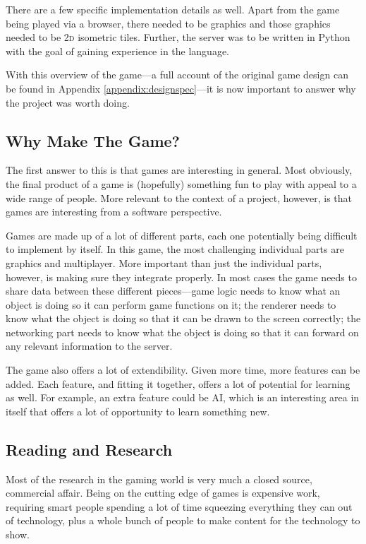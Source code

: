 There are a few specific implementation details as well. Apart from the game being played via a browser, there needed to be graphics and those graphics needed to be \textsc{2d} isometric tiles. Further, the server was to be written in Python with the goal of gaining experience in the language.

With this overview of the game---a full account of the original game design can be found in Appendix \ref{appendix:designspec}---it is now important to answer why the project was worth doing.

\subsection{Why Make The Game?}
The first answer to this is that games are interesting in general. Most obviously, the final product of a game is (hopefully) something fun to play with appeal to a wide range of people. More relevant to the context of a project, however, is that games are interesting from a software perspective.

Games are made up of a lot of different parts, each one potentially being difficult to implement by itself. In this game, the most challenging individual parts are graphics and multiplayer. More important than just the individual parts, however, is making sure they integrate properly. In most cases the game needs to share data between these different pieces---game logic needs to know what an object is doing so it can perform game functions on it; the renderer needs to know what the object is doing so that it can be drawn to the screen correctly; the networking part needs to know what the object is doing so that it can forward on any relevant information to the server.

The game also offers a lot of extendibility. Given more time, more features can be added. Each feature, and fitting it together, offers a lot of potential for learning as well. For example, an extra feature could be AI, which is an interesting area in itself that offers a lot of opportunity to learn something new.

\subsection{Reading and Research}
Most of the research in the gaming world is very much a closed source, commercial affair. Being on the cutting edge of games is expensive work, requiring smart people spending a lot of time squeezing everything they can out of technology, plus a whole bunch of people to make content for the technology to show.

